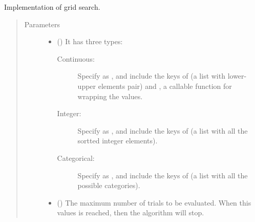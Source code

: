 \documentclass[letterpaper,10pt,english]{sphinxmanual}
\begin{document}
\begin{fulllineitems}
\label{\detokenize{apidoc:pybatdoe.batch_grid.GridSearch}}
Implementation of grid search.
\begin{quote}\begin{description}
\item[{Parameters}] \leavevmode\begin{itemize}
\item {} 
 () \textendash{} 
It has three types:
\begin{description}
\item[{Continuous: }] \leavevmode
Specify  as , and include the keys of  (a list with lower-upper elements pair) and
, a callable function for wrapping the values.

\item[{Integer:}] \leavevmode
Specify  as , and include the keys of  (a list with all the sortted integer elements).

\item[{Categorical:}] \leavevmode
Specify  as , and include the keys of  (a list with all the possible categories).

\end{description}


\item {} 
 (\sphinxstyleliteralemphasis{\sphinxupquote{, }}\sphinxstyleliteralemphasis{\sphinxupquote{, }}) \textendash{} The maximum number of trials to be evaluated. When this values is reached, 
then the algorithm will stop.


\end{itemize}
\end{description}
\end{quote}
\end{fulllineitems}
\end{document}
